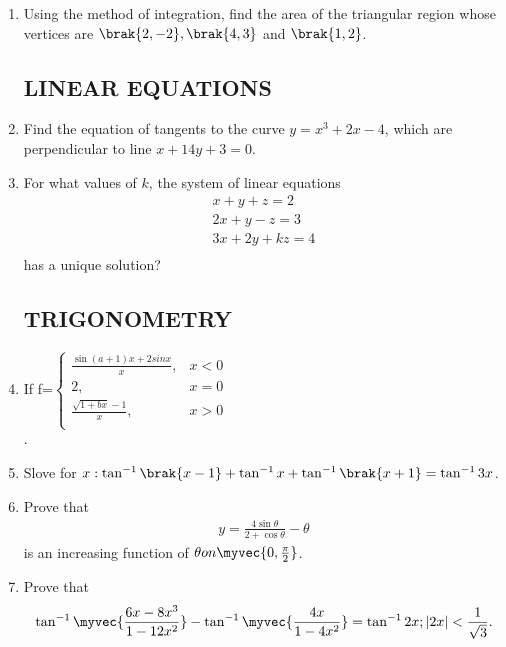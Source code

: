 \documentclass[12pt, -letter paper]{article}
\begin{document}
\begin{enumerate}
\item Using the method of integration, find the area     of the triangular region whose vertices are $\brak{2,-2}, \brak{4,3}$ and $\brak{1,2}$.




     \subsection*{LINEAR EQUATIONS}			

  \item Find the equation of tangents to the curve $y=x^3+2x-4$, which are perpendicular to line $x+14y+3=0$.
		
   \item For what values of $k$, the system of linear equations \begin{align*}                                                   x+y+z=2\\                                                      2x+y-z=3\\                                                     3x+2y+kz=4\\  \end{align*} 
   has a unique solution? 
 
     \subsection*{TRIGONOMETRY}


     \item If f=$\begin{cases}
    \frac{\sin(a+1)x+2 sinx}{x},&x<0\\   2  ,&x=0\\ \frac{\sqrt{1+bx}-1}{x},&x>0\\ \end{cases}$ \\
   .


 \item Slove for $x:\tan^{-1}\brak{x-1}+\tan^{-1}x+\tan^{-1}\brak{x+1}=\tan^{-1}3x$.

\item Prove that \begin{align*} y=\frac{4\sin{\theta}}{2+\cos    {\theta}}-\theta \end{align*} is an increasing function of $\theta on  \myvec{0,\frac{\pi}{2}}$.



 \item Prove that \begin{align*}\tan^{-1}\myvec{\frac{6x-8x^3}{1-12x^2}}-\tan^{-1}\myvec{\frac{4x}{1-4x^2}}=\tan^{-1}2x;|2x|<\frac{1}{\sqrt{3}}. \end{align*}



\end{enumerate}
\end{document}
